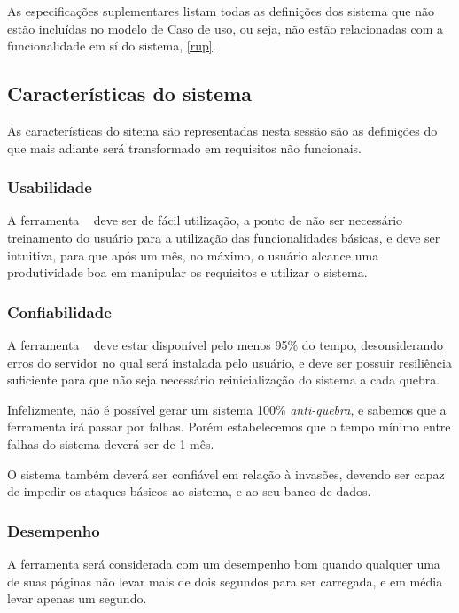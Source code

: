 As especificações suplementares listam todas as definições dos sistema que não estão incluídas no modelo de Caso de uso, ou seja, não estão relacionadas com a funcionalidade em sí do sistema, \ref{rup}.

\subsection{Características do sistema}
\label{subSection:suplementares_Caract_sistema}
As características do sitema são representadas nesta sessão são as definições do que mais adiante será transformado em requisitos não funcionais.

\subsubsection{Usabilidade}
	
	A ferramenta \nomeferramenta~ deve ser de fácil utilização, a ponto de não ser necessário treinamento do usuário para a utilização das funcionalidades básicas, e deve ser intuitiva, para que após um mês, no máximo, o usuário alcance uma produtividade boa em manipular os requisitos e utilizar o sistema.

\subsubsection{Confiabilidade}

	A ferramenta \nomeferramenta~ deve estar disponível pelo menos 95\% do tempo, desonsiderando erros do servidor no qual será instalada pelo usuário, e deve ser possuir resiliência suficiente para que não seja necessário reinicialização do sistema a cada quebra.

	Infelizmente, não é possível gerar um sistema 100\% \textit{anti-quebra}, e sabemos que a ferramenta irá passar por falhas. Porém estabelecemos que o tempo mínimo entre falhas do sistema deverá ser de 1 mês.

	O sistema também deverá ser confiável em relação à invasões, devendo ser capaz de impedir os ataques básicos ao sistema, e ao seu banco de dados.

\subsubsection{Desempenho}

	A ferramenta será considerada com um desempenho bom quando qualquer uma de suas páginas não levar mais de dois segundos para ser carregada, e em média levar apenas um segundo.

